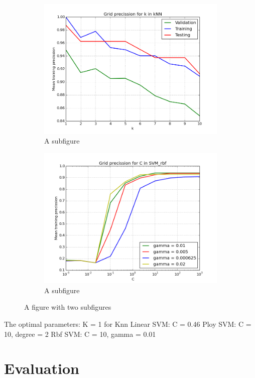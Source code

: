 \begin{figure}
\centering
\begin{subfigure}
  \centering
  \includegraphics[width=1\textwidth]{figuras/cv_knn.png}
  \caption{A subfigure}
  \label{fig:sub1}
\end{subfigure}%
\begin{subfigure}
  \centering
  \includegraphics[width=1\textwidth]{figuras/cv_svmr.png}
  \caption{A subfigure}
  \label{fig:sub2}
\end{subfigure}
\caption{A figure with two subfigures}
\label{fig:test}
\end{figure}

The optimal parameters:
K = 1 for Knn
Linear SVM: C = 0.46
Ploy SVM: C = 10, degree = 2
Rbf SVM: C = 10, gamma = 0.01

\section{Evaluation}
